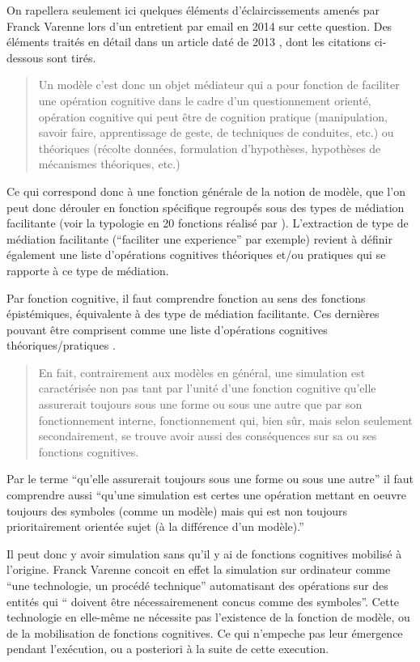 On rapellera seulement ici quelques éléments d'éclaircissements amenés par Franck Varenne lors d'un entretient par email en 2014 sur cette question. Des éléments traités en détail dans un article daté de 2013 \autocite{Varenne2013b}, dont les citations ci-dessous sont tirés. 

\blockquote[\cite{Varenne2013b}]{Un modèle c'est donc un objet médiateur qui a pour fonction de faciliter une opération cognitive dans le cadre d'un questionnement orienté, opération cognitive qui peut être de cognition pratique (manipulation, savoir­
faire, apprentissage de geste, de techniques de conduites, etc.) ou théoriques (récolte données, formulation d'hypothèses, hypothèses de mécanismes théoriques, etc.)}

Ce qui correspond donc à une fonction générale de la notion de modèle, que l'on peut donc dérouler en fonction spécifique regroupés sous des types de médiation facilitante (voir la typologie en 20 fonctions réalisé par \textcite{Varenne2013b}). L'extraction de type de médiation facilitante (\enquote{faciliter une experience} par exemple) revient à définir également une liste d'opérations cognitives théoriques et/ou pratiques qui se rapporte à ce type de médiation.

Par fonction cognitive, il faut comprendre fonction au sens des fonctions épistémiques, équivalente à des type de médiation facilitante. Ces dernières pouvant être comprisent comme une liste d'opérations cognitives théoriques/pratiques .

\blockquote[\cite{Varenne2013b}]{En fait, contrairement aux modèles en général, une simulation est caractérisée non pas tant par l'unité d'une fonction cognitive qu'elle assurerait toujours sous une forme ou sous une autre que par son fonctionnement interne, fonctionnement qui, bien sûr, mais selon seulement secondairement, se trouve avoir aussi des conséquences sur sa ou ses fonctions cognitives.}

Par le terme \enquote{qu'elle assurerait toujours sous une forme ou sous une autre} il faut comprendre aussi \enquote{qu'une simulation est certes une opération mettant en oeuvre toujours des symboles (comme un modèle) mais qui est non toujours prioritairement orientée sujet (à la différence d'un modèle).}

Il peut donc y avoir simulation sans qu'il y ai de fonctions cognitives mobilisé à l'origine. Franck Varenne concoit en effet la simulation sur ordinateur comme \enquote{une technologie, un procédé technique} automatisant des opérations sur des entités qui \enquote{ doivent être nécessairemenent concus comme des symboles}. Cette technologie en elle-même ne nécessite pas l'existence de la fonction de modèle, ou de la mobilisation de fonctions cognitives. Ce qui n'empeche pas leur émergence pendant l'exécution, ou a posteriori à la suite de cette execution.

